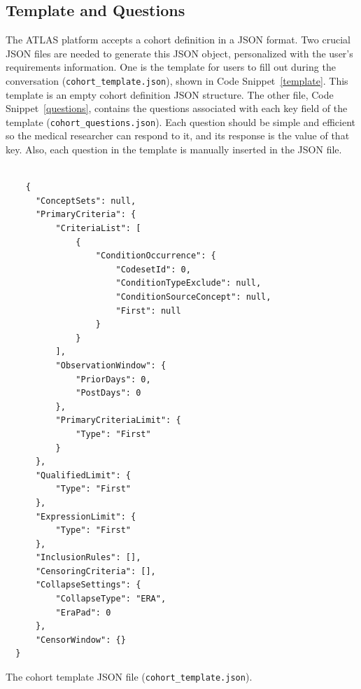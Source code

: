\subsection{Template and Questions}

The ATLAS platform accepts a cohort definition in a JSON format. Two crucial JSON files are needed to generate this JSON object, personalized with the user's requirements information. One is the template for users to fill out during the conversation {\small\normalfont(\texttt{cohort\_template.json})}, shown in Code Snippet~\ref{template}. This template is an empty cohort definition JSON structure. The other file, Code Snippet~\ref{questions}, contains the questions associated with each key field of the template {\small\normalfont(\texttt{cohort\_questions.json})}. Each question should be simple and efficient so the medical researcher can respond to it, and its response is the value of that key. Also, each question in the template is manually inserted in the JSON file.  

\begin{listing}[H]
  \begin{verbatim}
      
    {
      "ConceptSets": null,
      "PrimaryCriteria": {
          "CriteriaList": [
              {
                  "ConditionOccurrence": {
                      "CodesetId": 0,
                      "ConditionTypeExclude": null,
                      "ConditionSourceConcept": null,
                      "First": null
                  }
              }
          ],
          "ObservationWindow": {
              "PriorDays": 0,
              "PostDays": 0
          },
          "PrimaryCriteriaLimit": {
              "Type": "First"
          }
      },
      "QualifiedLimit": {
          "Type": "First"
      },
      "ExpressionLimit": {
          "Type": "First"
      },
      "InclusionRules": [],
      "CensoringCriteria": [],
      "CollapseSettings": {
          "CollapseType": "ERA",
          "EraPad": 0
      },
      "CensorWindow": {}
  }

  \end{verbatim}
\caption[The cohort template file]{The cohort template JSON file {\small\normalfont(\texttt{cohort\_template.json})}.}
\label{template}
\end{listing}  

